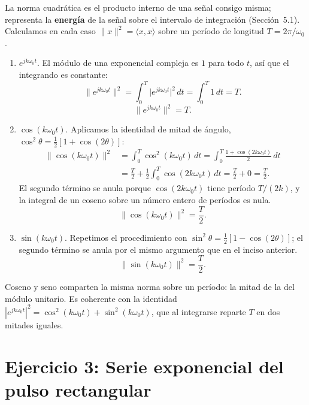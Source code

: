 \documentclass[10pt,a4paper]{article}
\begin{document}
	La norma cuadrática es el producto interno de una señal consigo misma; representa la \textbf{energía} de la señal sobre el intervalo de integración (Sección~5.1). Calculamos en cada caso $\|x\|^2 = \langle x, x\rangle$ sobre un período de longitud $T = 2\pi/\omega_0$.

	\begin{enumerate}[label=\textbf{\alph*)}]
		\item $e^{jk\omega_0 t}$. El módulo de una exponencial compleja es $1$ para todo $t$, así que el integrando es constante:
		\[
			\|e^{jk\omega_0 t}\|^2 = \int_{0}^{T} \big|e^{jk\omega_0 t}\big|^2\,dt = \int_{0}^{T} 1\,dt = T.
		\]
		\[
			\boxed{\|e^{jk\omega_0 t}\|^2 = T.}
		\]

		\item $\cos(k\omega_0 t)$. Aplicamos la identidad de mitad de ángulo, $\cos^2\theta = \tfrac{1}{2}[1 + \cos(2\theta)]$:
		\begin{align*}
			\|\cos(k\omega_0 t)\|^2
			&= \int_{0}^{T} \cos^2(k\omega_0 t)\,dt
			= \int_{0}^{T} \frac{1 + \cos(2k\omega_0 t)}{2}\,dt \\
			&= \frac{T}{2} + \frac{1}{2}\int_{0}^{T} \cos(2k\omega_0 t)\,dt
			= \frac{T}{2} + 0 = \frac{T}{2}.
		\end{align*}
		El segundo término se anula porque $\cos(2k\omega_0 t)$ tiene período $T/(2k)$, y la integral de un coseno sobre un número entero de períodos es nula.
		\[
			\boxed{\|\cos(k\omega_0 t)\|^2 = \frac{T}{2}.}
		\]

		\item $\sin(k\omega_0 t)$. Repetimos el procedimiento con $\sin^2\theta = \tfrac{1}{2}[1 - \cos(2\theta)]$; el segundo término se anula por el mismo argumento que en el inciso anterior.
		\[
			\boxed{\|\sin(k\omega_0 t)\|^2 = \frac{T}{2}.}
		\]
	\end{enumerate}

	Coseno y seno comparten la misma norma sobre un período: la mitad de la del módulo unitario. Es coherente con la identidad $|e^{jk\omega_0 t}|^2 = \cos^2(k\omega_0 t) + \sin^2(k\omega_0 t)$, que al integrarse reparte $T$ en dos mitades iguales.

	\section*{Ejercicio 3: Serie exponencial del pulso rectangular}
\end{document}
